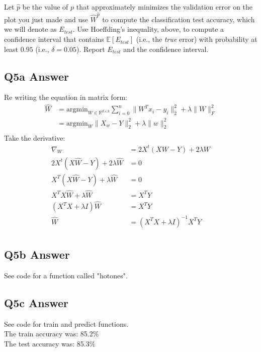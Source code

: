 \documentclass{article}
\newcommand{\1}{\mathbf{1}}
\def\E{\mathbb{E}}
\def\R{\mathbb{R}}
\begin{document}
\begin{enumerate}
Let $\widehat{p}$ be the value of $p$ that approximately minimizes the validation error on the plot you just made and use $\widehat{W}^{\widehat{p}}$ to compute the classification test accuracy, which we will denote as $E_{test}$. 
Use Hoeffding's inequality, above, to compute a confidence interval that contains $\E[E_{test}]$ (i.e., the \emph{true} error) with probability at least $0.95$ (i.e., $\delta=0.05$).
Report $E_{test}$ and the confidence interval. 


\end{enumerate}











\subsection{Q5a Answer}

Re writing the equation in matrix form:
\begin{align*}
\widehat{W} & = \text{argmin}_{W \in \R^{d \times k}} \sum_{i=0}^{n} \| W^Tx_{i} - y_{i} \|^{2}_{2} + \lambda \|W\|_{F}^{2} \\
& = \text{argmin}_W \| X_w - Y \|_2^2 + \lambda \|w\|_2^2 \\
\end{align*}
Take the derivative:
\begin{align*}
    \nabla_{W} & = 2 X^t(X W -Y) + 2 \lambda W \\
    2 X^t(X\widehat{W} -Y) + 2 \lambda \widehat{W} & = 0 \\
    X^T(X\widehat{W} -Y) + \lambda \widehat{W} & = 0 \\
    X^TX\widehat{W} + \lambda \widehat{W} & = X^T Y \\
    (X^TX + \lambda I ) \widehat{W} & = X^T Y \\
     \widehat{W} & =(X^TX + \lambda I )^{-1} X^T Y \\
\end{align*}


\subsection{Q5b Answer}
See code for a function called "hotones". 

\subsection{Q5c Answer}
See code for train and predict functions. \\
The train accuracy was: 85.2\% \\
The test accuracy was: 85.3\% \\
\end{document}
